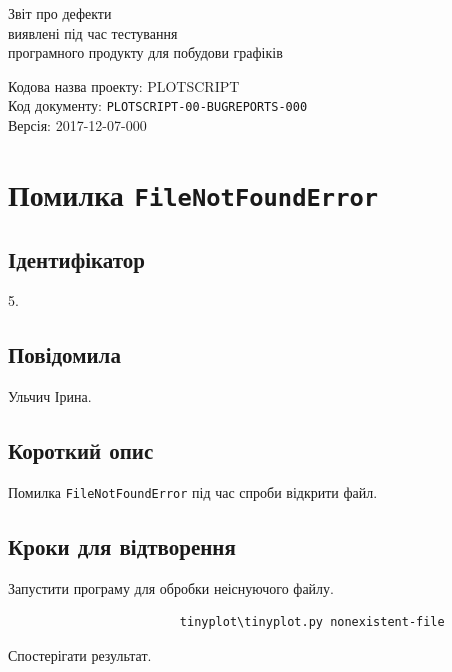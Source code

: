 \documentclass[a4paper,oneside,DIV=12,12pt]{scrartcl}
\newcommand{\theprojcode}{PLOTSCRIPT}
\newcommand{\theprojrev}{00}
\newcommand{\thedoctype}{BUGREPORTS}
\newcommand{\thedocnum}{000}
\newcommand{\thedocfullcode}{\theprojcode-\theprojrev-\thedoctype-\thedocnum}
\newcommand{\printdocfullcode}{\texttt{\thedocfullcode}}
\newcommand{\theversion}{2017-12-07-000}
\begin{document}
	\begin{titlepage}
	\begin{center}
		\vspace*{\fill}
			Звіт про дефекти\\
			виявлені під час тестування\\
			програмного продукту для побудови графіків
			
		\vspace*{\fill}
	\end{center}
	Кодова назва проекту: \theprojcode\\
	Код документу: \printdocfullcode\\
	Версія: \theversion\\
	\end{titlepage}
	
	\tableofcontents
	\newpage
	
	\section{Помилка \texttt{FileNotFoundError}}
		\subsection{Ідентифікатор}
			5.
			
		\subsection{Повідомила}
			Ульчич Ірина.
			
		\subsection{Короткий опис}
			Помилка \verb|FileNotFoundError| під час спроби відкрити файл.
			
		\subsection{Кроки для відтворення}
			\begin{steps}
				\item Запустити програму для обробки неіснуючого файлу.
					\begin{lstlisting}
						tinyplot\tinyplot.py nonexistent-file
					\end{lstlisting}
					
				\item Спостерігати результат.
			\end{steps}
			
\end{document}
